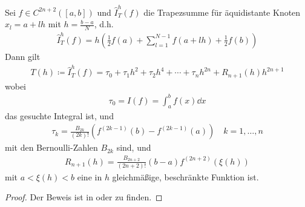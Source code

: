 \begin{Satze}
  Sei $f\in C^{2n+2}([a,b])$ und 
  $\hat{I}_T^h(f)$ die Trapezsumme
  für äquidistante Knoten $x_l=a+lh$
  mit $h=\frac{b-a}{N}$, d.h.
  \begin{gather}
    \hat{I}_T^h(f) = h\left(
      \frac{1}{2}f(a) + \sum_{l=1}^{N-1}f(a+lh) +
      \frac{1}{2}f(b)
    \right)
    \label{VII.3.1}
  \end{gather}
  Dann gilt
  \begin{gather}
    T(h) \coloneqq \hat{I}_T^h(f) = \tau_0+\tau_1h^2+\tau_2h^4
    +\dotsb + \tau_nh^{2n}+ R_{n+1}(h)h^{2n+1}
  \end{gather}
  wobei
  \begin{gather}
    \tau_0 = I(f) = \int_a^bf(x)\dd x
    \label{VII.3.3}
  \end{gather}
  das gesuchte Integral ist, und
  \begin{gather*}
    \tau_k = \frac{B_{2k}}{(2k)!}
    \left(f^{(2k-1)}(b)-f^{(2k-1)}(a)\right)
    \quad k=1,\dotsc, n
  \end{gather*}
  mit den Bernoulli-Zahlen $B_{2k}$ sind, und
  \begin{gather*}
    R_{n+1}(h) =
    \frac{B_{2n+2}}{(2n+2)!}(b-a)f^{(2n+2)}(\xi(h))
  \end{gather*}
  mit $a<\xi(h)<b$ eine in $h$
  gleichmäßige, beschränkte Funktion
  ist.

  \begin{proof}
    Der Beweis ist in
    \cite{stoerbulirsch} 
    oder \cite{haemmerlinhoffmann} zu finden.
  \end{proof}
\end{Satze}


